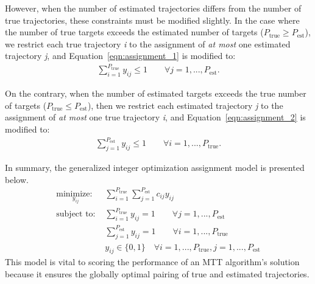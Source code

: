 However, when the number of estimated trajectories differs from the number of true trajectories, these constraints must be modified slightly. In the case where the number of true targets exceeds the estimated number of targets ($P_{\text{true}}\geq P_{\text{est}}$), we restrict each true trajectory \textit{i} to the assignment of \textit{at most} one estimated trajectory \textit{j}, and Equation~\ref{eqn:assignment_1} is modified to:
\begin{align*}
\sum_{i=1}^{P_{\text{true}}} y_{ij} \leq 1 \qquad \forall  j = 1,...,P_{\text{est}}.
\end{align*}

On the contrary, when the number of estimated targets exceeds the true number of targets ($P_{\text{true}}\leq P_{\text{est}}$), then we restrict each estimated trajectory \textit{j} to the assignment of \textit{at most} one true trajectory \textit{i}, and Equation~\ref{eqn:assignment_2} is modified to:
\begin{align*}
\sum_{j=1}^{P_{\text{est}}} y_{ij} \leq 1 \qquad \forall i = 1,...,P_{\text{true}}.
\end{align*}

In summary, the generalized integer optimization assignment model is presented below.  
\begin{align*}
\underset{y_{ij}}{\text{minimize: }} & \sum_{i=1}^{P_{\text{true}}} \sum_{j=1}^{P_{\text{est}}} c_{ij}y_{ij}\\
\text{subject to: }	& \sum_{i=1}^{P_{\text{true}}} y_{ij} = 1 \qquad \forall j = 1,...,P_{\text{est}} \nonumber \\
				& \sum_{j=1}^{P_{\text{est}}} y_{ij} = 1 \qquad \forall i = 1,...,P_{\text{true}} \nonumber \\
				& y_{ij} \in \{0,1\} \quad \forall i = 1,...,P_{\text{true}},j = 1,...,P_{\text{est}} \nonumber
\end{align*}
This model is vital to scoring the performance of an MTT algorithm's solution because it ensures the globally optimal pairing of true and estimated trajectories.


